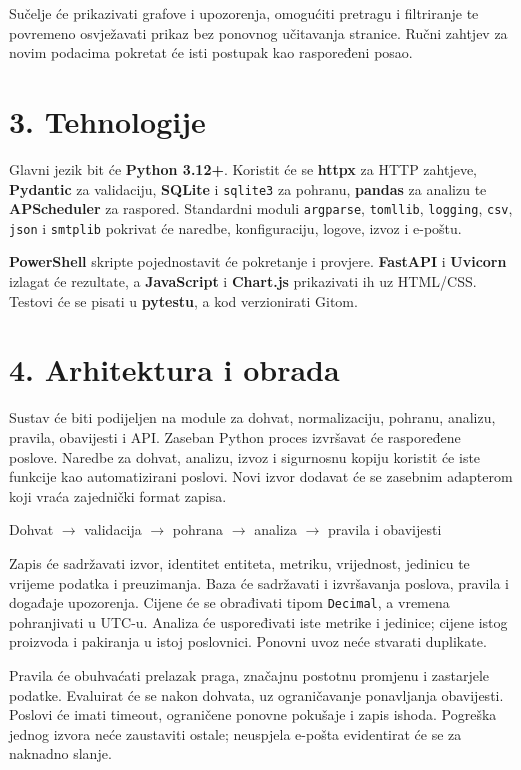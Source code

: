 \documentclass[a4paper,11pt]{article}
\begin{document}
Sučelje će prikazivati grafove i upozorenja, omogućiti pretragu i filtriranje
te povremeno osvježavati prikaz bez ponovnog učitavanja stranice. Ručni
zahtjev za novim podacima pokretat će isti postupak kao raspoređeni posao.

\section*{3. Tehnologije}
Glavni jezik bit će \textbf{Python 3.12+}. Koristit će se \textbf{httpx} za
HTTP zahtjeve, \mbox{\textbf{Pydantic}} za validaciju, \textbf{SQLite} i
\texttt{sqlite3} za pohranu, \textbf{pandas} za analizu te
\textbf{APScheduler} za raspored. Standardni moduli \texttt{argparse},
\texttt{tomllib}, \texttt{logging}, \texttt{csv}, \texttt{json} i
\texttt{smtplib} pokrivat će naredbe, konfiguraciju, logove, izvoz i e-poštu.

\textbf{PowerShell} skripte pojednostavit će pokretanje i provjere.
\textbf{FastAPI} i \textbf{Uvicorn} izlagat će rezultate, a
\mbox{\textbf{JavaScript}} i \textbf{Chart.js} prikazivati ih uz HTML/CSS.
Testovi će se pisati u \textbf{pytestu}, a kod verzionirati Gitom.

\newpage
\section*{4. Arhitektura i obrada}
Sustav će biti podijeljen na module za dohvat, normalizaciju, pohranu,
analizu, pravila, obavijesti i API. Zaseban Python proces izvršavat će
raspoređene poslove. Naredbe za dohvat, analizu, izvoz i sigurnosnu kopiju
koristit će iste funkcije kao automatizirani poslovi. Novi izvor dodavat
će se zasebnim adapterom koji vraća zajednički format zapisa.
\begin{center}
\small Dohvat $\rightarrow$ validacija $\rightarrow$ pohrana
$\rightarrow$ analiza $\rightarrow$ pravila i obavijesti
\end{center}

Zapis će sadržavati izvor, identitet entiteta, metriku, vrijednost, jedinicu
te vrijeme podatka i preuzimanja. Baza će sadržavati i izvršavanja poslova,
pravila i događaje upozorenja. Cijene će se obrađivati tipom
\texttt{Decimal}, a vremena pohranjivati u UTC-u. Analiza će uspoređivati
iste metrike i jedinice; cijene istog proizvoda i pakiranja u istoj
poslovnici. Ponovni uvoz neće stvarati duplikate.

Pravila će obuhvaćati prelazak praga, značajnu postotnu promjenu i
zastarjele podatke. Evaluirat će se nakon dohvata, uz ograničavanje
ponavljanja obavijesti. Poslovi će imati timeout, ograničene ponovne
pokušaje i zapis ishoda. Pogreška jednog izvora neće zaustaviti ostale;
neuspjela e-pošta evidentirat će se za naknadno slanje.
\end{document}
